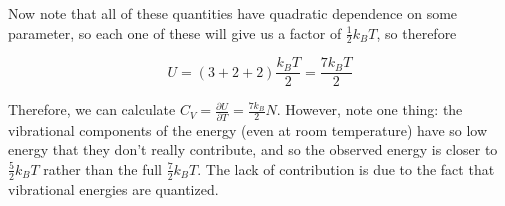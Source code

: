 Now note that all of these quantities have quadratic dependence on some parameter, so each one of these will give us a factor of $\frac 12 k_BT$, so therefore 

\[ U = (3 + 2 + 2) \frac{k_BT}{2} = \frac{7k_BT}{2}\] 

Therefore, we can calculate $C_V = \frac{\partial U}{\partial T} = \frac{7k_B}{2} N$. However, note one thing: the vibrational components of the energy (even at room temperature) have so low energy that they don't really contribute, and so the observed energy is closer to $\frac{5}{2} k_BT$ rather than the full $\frac{7}{2} k_BT$. The lack of contribution is due to the fact that vibrational energies are quantized.

